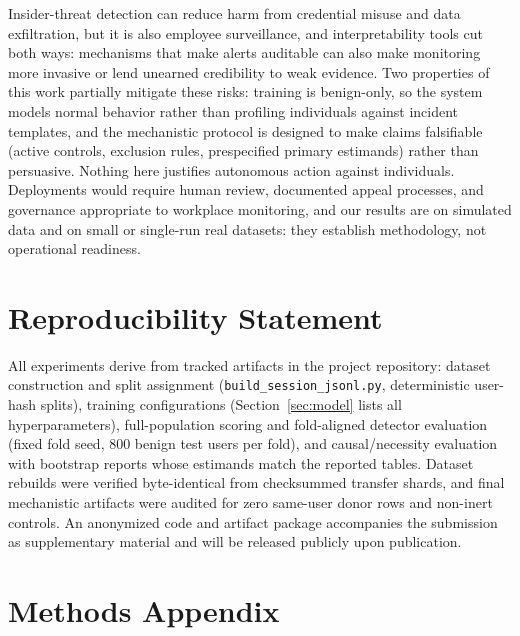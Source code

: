 \documentclass[10pt]{article} %
\begin{document}
Insider-threat detection can reduce harm from credential misuse and data
exfiltration, but it is also employee surveillance, and interpretability tools
cut both ways: mechanisms that make alerts auditable can also make monitoring
more invasive or lend unearned credibility to weak evidence. Two properties of
this work partially mitigate these risks: training is benign-only, so the
system models normal behavior rather than profiling individuals against
incident templates, and the mechanistic protocol is designed to make claims
falsifiable (active controls, exclusion rules, prespecified primary
estimands) rather than persuasive. Nothing here justifies autonomous action against
individuals. Deployments would require human review, documented appeal
processes, and governance appropriate to workplace monitoring, and our results
are on simulated data and on small or single-run real datasets: they establish methodology, not operational readiness.

\section*{Reproducibility Statement}

All experiments derive from tracked artifacts in the project repository:
dataset construction and split assignment
(\texttt{build\_session\_jsonl.py}, deterministic user-hash splits), training
configurations (Section~\ref{sec:model} lists all hyperparameters),
full-population scoring and fold-aligned detector evaluation (fixed fold seed,
$800$ benign test users per fold), and causal/necessity evaluation with
bootstrap reports whose estimands match the reported tables. Dataset rebuilds
were verified byte-identical from checksummed transfer shards, and final
mechanistic artifacts were audited for zero same-user donor rows and non-inert
controls. An anonymized code and artifact package accompanies the
submission as supplementary material and will be released publicly upon
publication.





\appendix

\section{Methods Appendix}
\label{app:methods}
\end{document}
